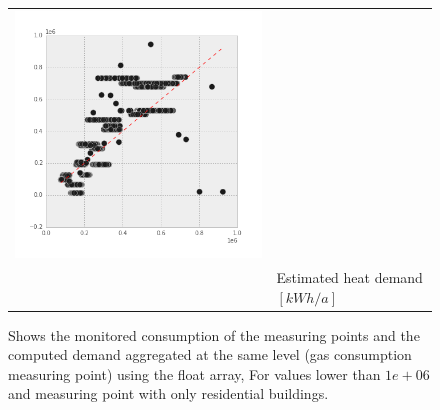 \begin{figure}[htb]
\begin{tabular}{lccc}
 \includegraphics[width= 0.28\linewidth]{FIGURES/EcoFYS-R_06}\\
&\multicolumn{3}{l}{Estimated heat demand $[kWh/a]$}\\

\end{tabular}	
	\caption[Consumption vs. demand with float array (residential buildings)]
	{Shows the monitored consumption of the measuring points
	and the computed demand aggregated at the same level 
	(gas consumption measuring point) using the float array, 
	For values lower than $1e+06$ and measuring point with only
    residential buildings.}
    \label{fig:con_dem_Residential}
\end{figure}
